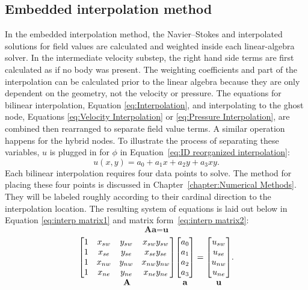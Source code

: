 \subsection{Embedded interpolation method}
\label{sec:ID embedded}
In the embedded interpolation method, the Navier--Stokes and interpolated solutions for field values are calculated and weighted inside each linear-algebra solver. 
In the intermediate velocity substep, the right hand side terms are first calculated as if no body was present. 
The weighting coefficients and part of the interpolation can be calculated prior to the linear algebra because they are only dependent on the geometry, not the velocity or pressure. 
The equations for bilinear interpolation, Equation \eqref{eq:Interpolation}, and interpolating to the ghost node, Equations \eqref{eq:Velocity Interpolation} or \eqref{eq:Pressure Interpolation}, are combined then rearranged to separate field value terms. 
A similar operation happens for the hybrid nodes. 
To illustrate the process of separating these variables, $u$ is plugged in for $\phi$ in Equation~\eqref{eq:ID reorganized interpolation}:
\begin{equation}
u(x,y) = a_0 + a_1x +a_2y+a_3xy.
\end{equation}
Each bilinear interpolation requires four data points to solve. 
The method for placing these four points is discussed in Chapter~\ref{chapter:Numerical Methods}. 
They will be labeled roughly according to their cardinal direction to the interpolation location. 
The resulting system of equations is laid out below in Equation \eqref{eq:interp matrix1} and matrix form~\eqref{eq:interp matrix2}:
\begin{equation}
\textbf{A}\textbf{a}=\textbf{u} \label{eq:interp matrix1}
\end{equation}
\begin{gather}
{\mathop{
\begin{bmatrix}
		  1&x_{sw}&y_{sw}&x_{sw}y_{sw}\\
		  1&x_{se}&y_{se}&x_{se}y_{se}\\
		  1&x_{nw}&y_{nw}&x_{nw}y_{nw}\\
		  1&x_{ne}&y_{ne}&x_{ne}y_{ne}
\end{bmatrix}
}_{\textstyle \textbf{A}}}
{\mathop{
\begin{bmatrix}
	a_0\\
	a_1\\
	a_2\\
	a_3
\end{bmatrix}
}_{\textstyle \textbf{a}\vphantom{A}}}
=
{\mathop{
\begin{bmatrix}
	u_{sw}\\
	u_{se}\\
	u_{nw}\\
	u_{ne}
\end{bmatrix}
}_{\textstyle \textbf{u}\vphantom{A}}}.
\label{eq:interp matrix2}
\end{gather}
